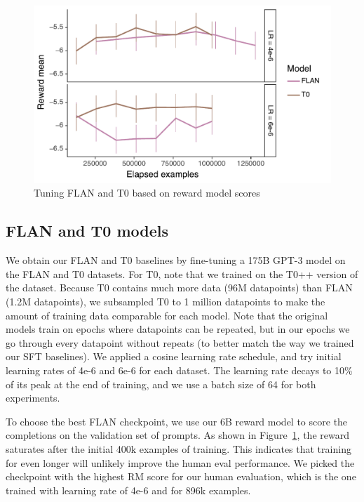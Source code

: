 \documentclass{article}
\begin{document}
\begin{figure}
    \centering
    \includegraphics[width=\linewidth]{figs/flan-t0-tuning.pdf}
    \caption{Tuning FLAN and T0 based on reward model scores}
    \label{fig:flan-t0-tuning}
\end{figure}

\subsection{FLAN and T0 models}
We obtain our FLAN and T0 baselines by fine-tuning a 175B GPT-3 model on the FLAN and T0 datasets. For T0, note that we trained on the T0++ version of the dataset.
Because T0 contains much more data (96M datapoints) than FLAN (1.2M datapoints), we subsampled T0 to 1 million datapoints to make the amount of training data comparable for each model. Note that the original models train on epochs where datapoints can be repeated, but in our epochs we go through every datapoint without repeats (to better match the way we trained our SFT baselines).
We applied a cosine learning rate schedule, and try initial learning rates of 4e-6 and 6e-6 for each dataset. The learning rate decays to 10\% of its peak at the end of training, and we use a batch size of 64 for both experiments. 

To choose the best FLAN checkpoint, we use our 6B reward model to score the completions on the validation set of prompts. As shown in Figure~\ref{fig:flan-t0-tuning}, the reward saturates after the initial 400k examples of training. This indicates that training for even longer will unlikely improve the human eval performance. We picked the checkpoint with the highest RM score for our human evaluation, which is the one trained with learning rate of 4e-6 and for 896k examples.
\end{document}
